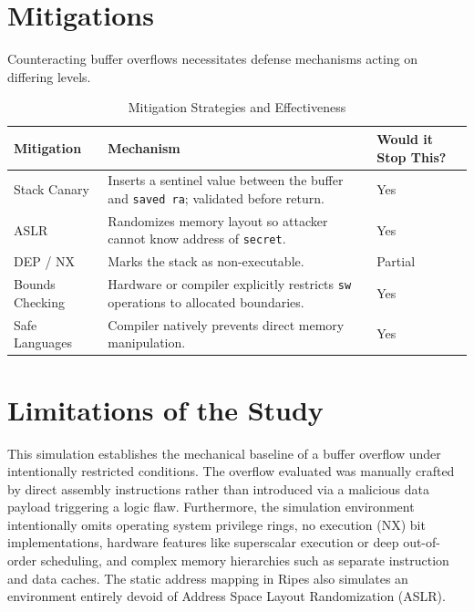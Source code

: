 \section{Mitigations}
Counteracting buffer overflows necessitates defense mechanisms acting on differing levels. 

\begin{table}[h]
\caption{Mitigation Strategies and Effectiveness}
\centering
\begin{tabular}{|p{3cm}|p{7cm}|l|}
\hline
\textbf{Mitigation} & \textbf{Mechanism} & \textbf{Would it Stop This?} \\
\hline
Stack Canary & Inserts a sentinel value between the buffer and \texttt{saved ra}; validated before return. & Yes \\
ASLR & Randomizes memory layout so attacker cannot know address of \texttt{secret}. & Yes \\
DEP / NX & Marks the stack as non-executable. & Partial \\
Bounds Checking & Hardware or compiler explicitly restricts \texttt{sw} operations to allocated boundaries. & Yes \\
Safe Languages & Compiler natively prevents direct memory manipulation. & Yes \\
\hline
\end{tabular}
\label{tab:mitigations}
\end{table}

\section{Limitations of the Study}
This simulation establishes the mechanical baseline of a buffer overflow under intentionally restricted conditions. The overflow evaluated was manually crafted by direct assembly instructions rather than introduced via a malicious data payload triggering a logic flaw. Furthermore, the simulation environment intentionally omits operating system privilege rings, no execution (NX) bit implementations, hardware features like superscalar execution or deep out-of-order scheduling, and complex memory hierarchies such as separate instruction and data caches. The static address mapping in Ripes also simulates an environment entirely devoid of Address Space Layout Randomization (ASLR).
